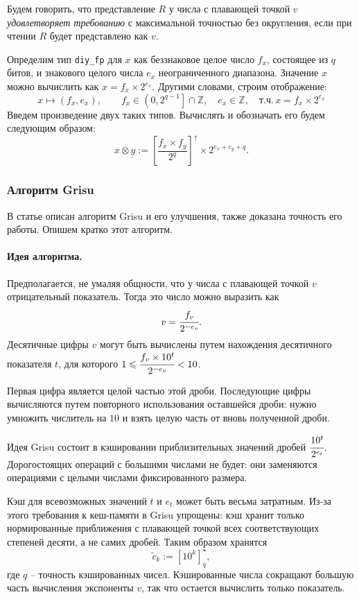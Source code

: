 Будем говорить, что представление $R$ у числа с плавающей точкой $v$ \textit{удовлетворяет требованию} с максимальной точностью без округления, если при чтении $R$ будет представлено как $v$.

Определим тип \texttt{diy\_fp} для $x$ как беззнаковое целое число $f_x$, состоящее из $q$ битов, и знакового целого числа $e_x$ неограниченного диапазона.
Значение $x$ можно вычислить как $x= f_x \times 2^{e_x}$. 
Другими словами, строим отображение:
$$x \mapsto (f_x, e_x), \qquad f_x \in \left(0, 2^{q-1}\right] \cap \mathbb{Z}, \quad e_x \in \mathbb{Z},\quad \mbox{т.ч.}\, x=f_x \times 2^{e_x}$$
Введем произведение двух таких типов.
Вычислять и обозначать его будем следующим образом:
$$x \otimes y := \left[ \frac{f_x \times f_y}{2^q}\right]^\uparrow \times 2^{e_x+e_y+q}.$$
\subsubsection{Алгоритм \textsf{Grisu}}
В статье \cite{1} описан алгоритм \textsf{Grisu} и его улучшения, также доказана точность его работы.
Опишем кратко этот алгоритм.
\paragraph{Идея алгоритма.}
Предполагается, не умаляя общности, что у числа с плавающей точкой $v$ отрицательный показатель. 
Тогда это число можно выразить как $$v=\cfrac{f_v}{2^{-e_v}}.$$
Десятичные цифры $v$ могут быть вычислены путем нахождения десятичного показателя $t$, для которого $1 \leqslant \cfrac{f_v \times 10^t}{2^{-e_v}} < 10$.

Первая цифра является целой частью этой дроби. 
Последующие цифры вычисляются путем повторного использования оставшейся дроби: нужно умножить числитель на $10$ и взять целую часть от вновь полученной дроби.

Идея \textsf{Grisu} состоит в кэшировании приблизительных значений дробей $\cfrac{10^t}{2^{e_t}}$.
Дорогостоящих операций с большими числами не будет: они заменяются операциями с целыми числами фиксированного размера.

Кэш для всевозможных значений $t$ и $e_t$ может быть весьма затратным. 
Из-за этого требования к кеш-памяти в \textsf{Grisu} упрощены: кэш хранит только нормированные приближения с плавающей точкой всех соответствующих степеней десяти, а не самих дробей. Таким образом хранятся $$\tilde{c}_k := \left[ 10^k \right]_q^{\star},$$ где $q$ -- точность кэшированных чисел.
Кэшированные числа сокращают большую часть вычисления экспоненты $v$, так что остается вычислить только показатель. 

